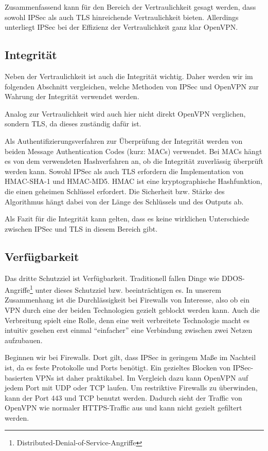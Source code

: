 \documentclass[12pt]{scrartcl}
\begin{document}
Zusammenfassend kann für den Bereich der Vertraulichkeit gesagt werden, dass sowohl IPSec als auch TLS hinreichende Vertraulichkeit bieten. Allerdings unterliegt IPSec bei der Effizienz der Vertraulichkeit ganz klar OpenVPN.

\subsection{Integrität}
Neben der Vertraulichkeit ist auch die Integrität wichtig. Daher werden wir im folgenden Abschnitt vergleichen, welche Methoden von IPSec und OpenVPN zur Wahrung der Integrität verwendet werden.

Analog zur Vertraulichkeit wird auch hier nicht direkt OpenVPN verglichen, sondern TLS, da dieses zuständig dafür ist.

Als Authentifizierungsverfahren zur Überprüfung der Integrität werden von beiden Message Authentication Codes (kurz: MACs) verwendet. Bei MACs hängt es von dem verwendeten Hashverfahren an, ob die Integrität zuverlässig überprüft werden kann. Sowohl IPSec als auch TLS erfordern die Implementation von HMAC-SHA-1 und HMAC-MD5. HMAC ist eine kryptographische Hashfunktion, die einen geheimen Schlüssel erfordert. Die Sicherheit bzw. Stärke des Algorithmus hängt dabei von der Länge des Schlüssels und des Outputs ab.\cite{Alshamsi2005}

Als Fazit für die Integrität kann gelten, dass es keine wirklichen Unterschiede zwischen IPSec und TLS in diesem Bereich gibt.

\subsection{Verfügbarkeit}
Das dritte Schutzziel ist Verfügbarkeit. Traditionell fallen Dinge wie DDOS-Angriffe\footnote{Distributed-Denial-of-Service-Angriffe} unter dieses Schutzziel bzw. beeinträchtigen es. In unserem Zusammenhang ist die Durchlässigkeit bei Firewalls von Interesse, also ob ein VPN durch eine der beiden Technologien gezielt geblockt werden kann. Auch die Verbreitung spielt eine Rolle, denn eine weit verbreitete Technologie macht es intuitiv gesehen erst einmal "`einfacher"' eine Verbindung zwischen zwei Netzen aufzubauen.

Beginnen wir bei Firewalls. Dort gilt, dass IPSec in geringem Maße im Nachteil ist, da es feste Protokolle und Ports benötigt. Ein gezieltes Blocken von IPSec-basierten VPNs ist daher praktikabel. Im Vergleich dazu kann OpenVPN auf jedem Port mit UDP oder TCP laufen. Um restriktive Firewalls zu überwinden, kann der Port 443 und TCP benutzt werden. Dadurch sieht der Traffic von OpenVPN wie normaler HTTPS-Traffic aus und kann nicht gezielt gefiltert werden.\cite{Sun2011}
\end{document}
